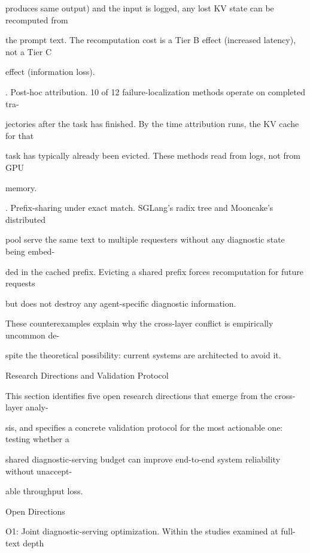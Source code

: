 \begin{flushleft}
\noindent  produces same output) and the input is logged, any lost KV state can be recomputed from\par
\noindent  the prompt text. The recomputation cost is a Tier B effect (increased latency), not a Tier C\par
\noindent  effect (information loss).\par
{}. Post-hoc attribution. 10 of 12 failure-localization methods operate on completed tra-\par
\noindent  jectories after the task has finished. By the time attribution runs, the KV cache for that\par
\noindent  task has typically already been evicted. These methods read from logs, not from GPU\par
\noindent  memory.\par
{}. Prefix-sharing under exact match. SGLang’s radix tree and Mooncake’s distributed\par
\noindent  pool serve the same text to multiple requesters without any diagnostic state being embed-\par
\noindent  ded in the cached prefix. Evicting a shared prefix forces recomputation for future requests\par
\noindent  but does not destroy any agent-specific diagnostic information.\par
\noindent  These counterexamples explain why the cross-layer conflict is empirically uncommon de-\par
\noindent spite the theoretical possibility: current systems are architected to avoid it.\par
\par\smallskip
\par\smallskip
{} Research Directions and Validation Protocol\par
\noindent This section identifies five open research directions that emerge from the cross-layer analy-\par
\noindent sis, and specifies a concrete validation protocol for the most actionable one: testing whether a\par
\noindent shared diagnostic-serving budget can improve end-to-end system reliability without unaccept-\par
\noindent able throughput loss.\par
\par\smallskip
{} Open Directions\par
\noindent O1: Joint diagnostic-serving optimization. Within the studies examined at full-text depth\par

\end{flushleft}
